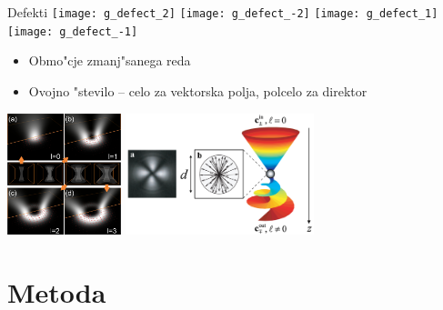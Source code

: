 \documentclass{beamer}
\begin{document}
\begin{frame}{Defekti}
 \texttt{[image: g\_defect\_2]}
 \texttt{[image: g\_defect\_-2]}
 \texttt{[image: g\_defect\_1]}
 \texttt{[image: g\_defect\_-1]}

 \begin{itemize}
  \item Obmo"cje zmanj"sanega reda
  \item Ovojno "stevilo -- celo za vektorska polja, polcelo za direktor
 \end{itemize}
 
 \begin{center}
 \includegraphics[height=100pt]{./Slike/1_v6} \qquad
 \includegraphics[height=100pt]{./Slike/defekt-kapljica.png}
 \end{center}
 
\end{frame}

\section{Metoda}
\end{document}
